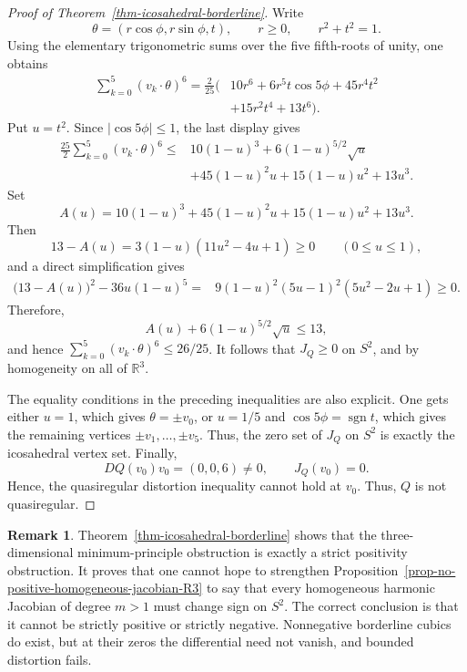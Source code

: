 \documentclass[10pt]{amsart}
\numberwithin{equation}{section}
\theoremstyle{definition}
\newtheorem{remark}{Remark}[section]
\newcommand{\R}{\mathbb R}
\begin{document}
\begin{proof}[Proof of Theorem~\ref{thm-icosahedral-borderline}]
Write
\[
        \theta=(r\cos\phi,r\sin\phi,t),
        \qquad r\ge0,
        \qquad r^2+t^2=1.
\]
Using the elementary trigonometric sums over the five fifth-roots of unity,
one obtains
\[
\begin{aligned}
        \sum_{k=0}^{5}(v_k\cdot\theta)^6
        =\frac2{25}\bigl(&10r^6+6r^5t\cos5\phi+45r^4t^2 \\
        &+15r^2t^4+13t^6\bigr).
\end{aligned}
\]
Put \(u=t^2\). Since \(|\cos5\phi|\le1\), the last display gives
\[
\begin{aligned}
        \frac{25}{2}
        \sum_{k=0}^{5}(v_k\cdot\theta)^6
        \le{}&10(1-u)^3+6(1-u)^{5/2}\sqrt u \\
        &+45(1-u)^2u+15(1-u)u^2+13u^3.
\end{aligned}
\]
Set
\[
        A(u)=10(1-u)^3+45(1-u)^2u+15(1-u)u^2+13u^3.
\]
Then
\[
        13-A(u)=3(1-u)(11u^2-4u+1)\ge0
        \qquad (0\le u\le1),
\]
and a direct simplification gives
\[
\begin{aligned}
        \bigl(13-A(u)\bigr)^2-36u(1-u)^5
        ={}&9(1-u)^2(5u-1)^2(5u^2-2u+1)\ge0.
\end{aligned}
\]
Therefore,
\[
        A(u)+6(1-u)^{5/2}\sqrt u\le13,
\]
and hence \(\sum_{k=0}^{5}(v_k\cdot\theta)^6\le26/25\). It follows that
\(J_Q\ge0\) on \(S^2\), and by homogeneity on all of \(\R^3\).

The equality conditions in the preceding inequalities are also explicit. One
gets either \(u=1\), which gives \(\theta=\pm v_0\), or \(u=1/5\) and
\(\cos5\phi=\operatorname{sgn}t\), which gives the remaining vertices
\(\pm v_1,\ldots,\pm v_5\). Thus, the zero set of \(J_Q\) on \(S^2\) is
exactly the icosahedral vertex set. Finally,
\[
        DQ(v_0)v_0=(0,0,6)\ne0,
        \qquad
        J_Q(v_0)=0.
\]
Hence, the quasiregular distortion inequality cannot hold at \(v_0\). Thus,
\(Q\) is not quasiregular.
\end{proof}

\begin{remark}
Theorem~\ref{thm-icosahedral-borderline} shows that the three-dimensional
minimum-principle obstruction is exactly a strict positivity obstruction. It proves that
one cannot hope to strengthen Proposition~\ref{prop-no-positive-homogeneous-jacobian-R3}
to say that every homogeneous harmonic Jacobian of degree \(m>1\) must change
sign on \(S^2\). The correct conclusion is that it cannot be strictly
positive or strictly negative. Nonnegative borderline cubics do exist, but at
their zeros the differential need not vanish, and bounded distortion fails.
\end{remark}
\end{document}
